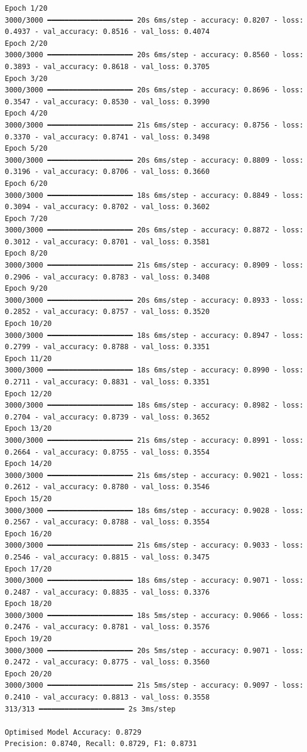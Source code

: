\documentclass[11pt]{article}
\begin{document}
\begin{enumerate}
\begin{verbatim}
Epoch 1/20
3000/3000 ━━━━━━━━━━━━━━━━━━━━ 20s 6ms/step - accuracy: 0.8207 - loss: 0.4937 - val_accuracy: 0.8516 - val_loss: 0.4074
Epoch 2/20
3000/3000 ━━━━━━━━━━━━━━━━━━━━ 20s 6ms/step - accuracy: 0.8560 - loss: 0.3893 - val_accuracy: 0.8618 - val_loss: 0.3705
Epoch 3/20
3000/3000 ━━━━━━━━━━━━━━━━━━━━ 20s 6ms/step - accuracy: 0.8696 - loss: 0.3547 - val_accuracy: 0.8530 - val_loss: 0.3990
Epoch 4/20
3000/3000 ━━━━━━━━━━━━━━━━━━━━ 21s 6ms/step - accuracy: 0.8756 - loss: 0.3370 - val_accuracy: 0.8741 - val_loss: 0.3498
Epoch 5/20
3000/3000 ━━━━━━━━━━━━━━━━━━━━ 20s 6ms/step - accuracy: 0.8809 - loss: 0.3196 - val_accuracy: 0.8706 - val_loss: 0.3660
Epoch 6/20
3000/3000 ━━━━━━━━━━━━━━━━━━━━ 18s 6ms/step - accuracy: 0.8849 - loss: 0.3094 - val_accuracy: 0.8702 - val_loss: 0.3602
Epoch 7/20
3000/3000 ━━━━━━━━━━━━━━━━━━━━ 20s 6ms/step - accuracy: 0.8872 - loss: 0.3012 - val_accuracy: 0.8701 - val_loss: 0.3581
Epoch 8/20
3000/3000 ━━━━━━━━━━━━━━━━━━━━ 21s 6ms/step - accuracy: 0.8909 - loss: 0.2906 - val_accuracy: 0.8783 - val_loss: 0.3408
Epoch 9/20
3000/3000 ━━━━━━━━━━━━━━━━━━━━ 20s 6ms/step - accuracy: 0.8933 - loss: 0.2852 - val_accuracy: 0.8757 - val_loss: 0.3520
Epoch 10/20
3000/3000 ━━━━━━━━━━━━━━━━━━━━ 18s 6ms/step - accuracy: 0.8947 - loss: 0.2799 - val_accuracy: 0.8788 - val_loss: 0.3351
Epoch 11/20
3000/3000 ━━━━━━━━━━━━━━━━━━━━ 18s 6ms/step - accuracy: 0.8990 - loss: 0.2711 - val_accuracy: 0.8831 - val_loss: 0.3351
Epoch 12/20
3000/3000 ━━━━━━━━━━━━━━━━━━━━ 18s 6ms/step - accuracy: 0.8982 - loss: 0.2704 - val_accuracy: 0.8739 - val_loss: 0.3652
Epoch 13/20
3000/3000 ━━━━━━━━━━━━━━━━━━━━ 21s 6ms/step - accuracy: 0.8991 - loss: 0.2664 - val_accuracy: 0.8755 - val_loss: 0.3554
Epoch 14/20
3000/3000 ━━━━━━━━━━━━━━━━━━━━ 21s 6ms/step - accuracy: 0.9021 - loss: 0.2612 - val_accuracy: 0.8780 - val_loss: 0.3546
Epoch 15/20
3000/3000 ━━━━━━━━━━━━━━━━━━━━ 18s 6ms/step - accuracy: 0.9028 - loss: 0.2567 - val_accuracy: 0.8788 - val_loss: 0.3554
Epoch 16/20
3000/3000 ━━━━━━━━━━━━━━━━━━━━ 21s 6ms/step - accuracy: 0.9033 - loss: 0.2546 - val_accuracy: 0.8815 - val_loss: 0.3475
Epoch 17/20
3000/3000 ━━━━━━━━━━━━━━━━━━━━ 18s 6ms/step - accuracy: 0.9071 - loss: 0.2487 - val_accuracy: 0.8835 - val_loss: 0.3376
Epoch 18/20
3000/3000 ━━━━━━━━━━━━━━━━━━━━ 18s 5ms/step - accuracy: 0.9066 - loss: 0.2476 - val_accuracy: 0.8781 - val_loss: 0.3576
Epoch 19/20
3000/3000 ━━━━━━━━━━━━━━━━━━━━ 20s 5ms/step - accuracy: 0.9071 - loss: 0.2472 - val_accuracy: 0.8775 - val_loss: 0.3560
Epoch 20/20
3000/3000 ━━━━━━━━━━━━━━━━━━━━ 21s 5ms/step - accuracy: 0.9097 - loss: 0.2410 - val_accuracy: 0.8813 - val_loss: 0.3558
313/313 ━━━━━━━━━━━━━━━━━━━━ 2s 3ms/step

Optimised Model Accuracy: 0.8729
Precision: 0.8740, Recall: 0.8729, F1: 0.8731
\end{verbatim}

\end{enumerate}
\end{document}
